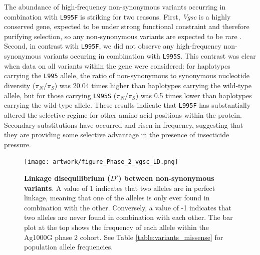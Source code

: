 \documentclass[a4paper,11pt,abstracton,hidelinks]{scrartcl}
\begin{document}
The abundance of high-frequency non-synonymous variants occurring in combination with \texttt{L995F} is striking for two reasons.
%
First, \textit{Vgsc} is a highly conserved gene, expected to be under strong functional constraint and therefore purifying selection, so any non-synonymous variants are expected to be rare \cite{Davies2007b}.
%
Second, in contrast with \texttt{L995F}, we did not observe any high-frequency non-synonymous variants occuring in combination with \texttt{L995S}.
%
This contrast was clear when data on all variants within the gene were considered: for haplotypes carrying the \texttt{L995} allele, the ratio of non-synonymous to synonymous nucleotide diversity ($\pi_{N}/\pi_{S}$) was 20.04 times higher than haplotypes carrying the wild-type allele, but for those carrying \texttt{L995S} ($\pi_{N}/\pi_{S}$) was 0.5 times lower than haplotypes carrying the wild-type allele.
%
These results indicate that \texttt{L995F} has substantially altered the selective regime for other amino acid positions within the protein.
%
Secondary substitutions have occurred and risen in frequency, suggesting that they are providing some selective advantage in the presence of insecticide pressure.


%
\begin{figure}[!t]

  \centering

  \texttt{[image: artwork/figure\_Phase\_2\_vgsc\_LD.png]}

  \caption{\textbf{Linkage disequilibrium ($D'$) between non-synonymous variants}. A value of 1 indicates that two alleles are in perfect linkage, meaning that one of the alleles is only ever found in combination with the other. Conversely, a value of -1 indicates that two alleles are never found in combination with each other. The bar plot at the top shows the frequency of each allele within the Ag1000G phase 2 cohort. See Table \ref{table:variants_missense} for population allele frequencies.}

  \label{fig:ld}

\end{figure}
\end{document}
